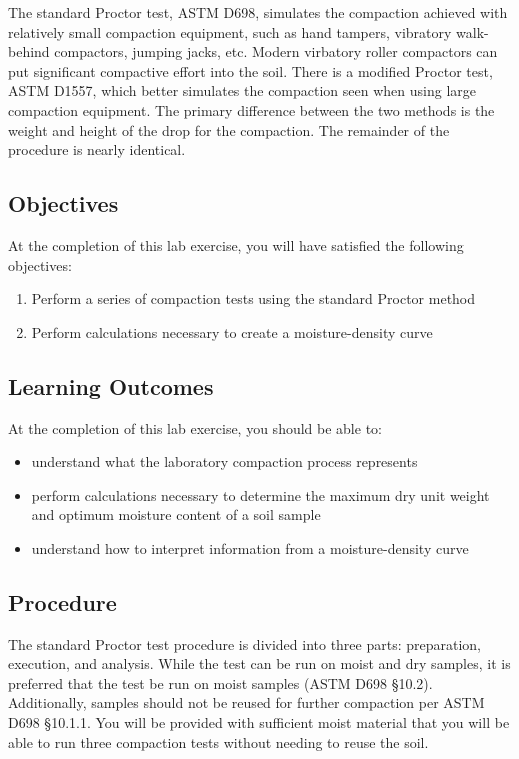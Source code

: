 \documentclass[12pt]{article}
\begin{document}
The standard Proctor test, ASTM D698, simulates the compaction achieved with relatively small compaction equipment, such as hand tampers, vibratory walk-behind compactors, jumping jacks, etc. Modern virbatory roller compactors can put significant compactive effort into the soil. There is a modified Proctor test, ASTM D1557, which better simulates the compaction seen when using large compaction equipment. The primary difference between the two methods is the weight and height of the drop for the compaction. The remainder of the procedure is nearly identical.

\subsection{Objectives}
\label{ssec:headingscap}
At the completion of this lab exercise, you will have satisfied the following objectives:
\begin{enumerate}
    \item Perform a series of compaction tests using the standard Proctor method
    \item Perform calculations necessary to create a moisture-density curve
\end{enumerate}

\subsection{Learning Outcomes}
At the completion of this lab exercise, you should be able to:
\begin{itemize}
    \item understand what the laboratory compaction process represents
    \item perform calculations necessary to determine the maximum dry unit weight and optimum moisture content of a soil sample
    \item understand how to interpret information from a moisture-density curve
\end{itemize}

\pagebreak
\subsection{Procedure}
The standard Proctor test procedure is divided into three parts: preparation, execution, and analysis. While the test can be run on moist and dry samples, it is preferred that the test be run on moist samples (ASTM D698 \S10.2). Additionally, samples should not be reused for further compaction per ASTM D698 \S10.1.1. You will be provided with sufficient moist material that you will be able to run three compaction tests without needing to reuse the soil.
\end{document}

